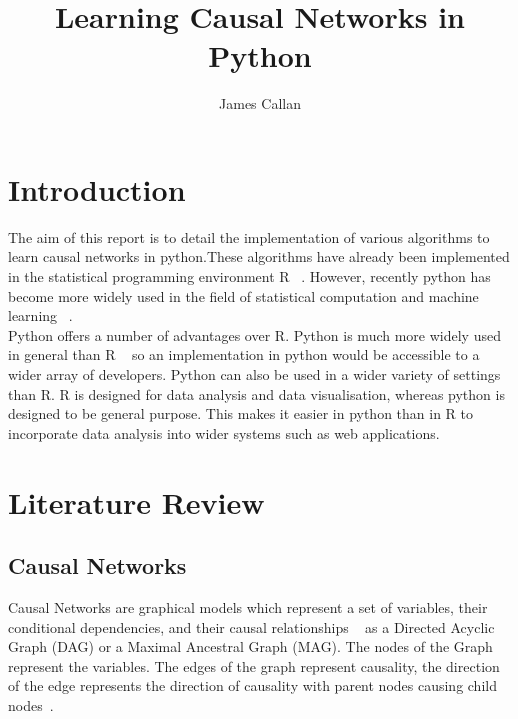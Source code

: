 \documentclass{UoYCSproject}
\begin{document}
\title{Learning Causal Networks in Python}
\author{James Callan}
\MEng
\date{}

\maketitle

\listoffigures
\listoftables

\begin{summary}
\end{summary}
\chapter{Introduction}
The aim of this report is to detail the implementation of various algorithms to learn causal networks in python.These algorithms have already been implemented in the statistical programming environment R ~\parencite{kalisch_hauser_maechler}. However, recently python has become more widely used in the field of statistical computation and machine learning ~\parencite{piatetsky}.\\

Python offers a number of advantages over R. Python is much more widely used in general than R ~\parencite{ogrady_2019} so an implementation in python would be accessible to a wider array of developers. Python can also be used in a wider variety of settings than R. R is designed for data analysis and data visualisation, whereas python is designed to be general purpose. This makes it easier in python than in R to incorporate data analysis into wider systems such as web applications.\\



\chapter{Literature Review}

\section{Causal Networks}

Causal Networks are graphical models which represent a set of variables, their conditional dependencies, and their causal relationships ~\parencite{verma1990causal} as a Directed Acyclic Graph (DAG) or a Maximal Ancestral Graph (MAG). The nodes of the Graph represent the variables. The edges of the graph represent causality, the direction of the edge represents the direction of causality with parent nodes causing child nodes~\parencite{verma1990causal}. 
\end{document}
